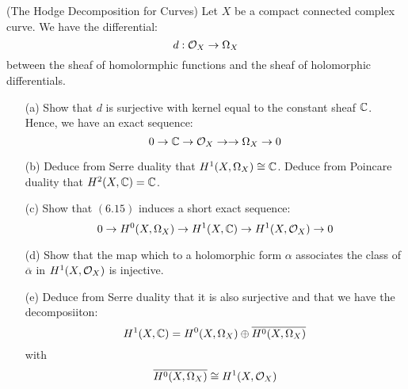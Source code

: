 \documentclass[12pt]{article}
\begin{document}
\begin{problem}{3}(The Hodge Decomposition for Curves)
    Let $X$ be a compact connected complex curve. We have the differential:
    \[d: \mathcal{O}_X \to \Omega_X\]
    between the sheaf of homolormphic functions and the sheaf of holomorphic differentials.
    \begin{enumerate}
        \item[(a)] Show that $d$ is surjective with kernel equal to the constant sheaf $\mathbb C$. Hence, we have an exact sequence: 
        \[ 0 \to \mathbb C \to \mathcal{O}_X \rightarrow \to \Omega_X \to 0\]
        \item[(b)] Deduce from Serre duality that $H^1(X, \Omega_X) \cong \mathbb C$. Deduce from Poincare duality that $H^2(X, \mathbb C) = \mathbb C$. 
        \item[(c)] Show that $(6.15)$ induces a short exact sequence: 
        \[ 0 \to H^0(X, \Omega_X) \to H^1(X, \mathbb C) \to H^1(X, \mathcal{O}_X) \to 0\]
        \item[(d)] Show that the map which to a holomorphic form $\alpha$ associates the class of $\overline{\alpha}$ in $H^1(X, \mathcal{O}_X)$ is injective.
        \item[(e)] Deduce from Serre duality that it is also surjective and that we have the decomposiiton: 
        \[ H^1(X, \mathbb C) = H^0(X, \Omega_X) \oplus \overline{H^0(X, \Omega_X)}\]
        with 
        \[ \overline{H^0(X, \Omega_X)} \cong H^1(X, \mathcal{O}_X)\]
    \end{enumerate}

\end{problem}
\end{document}
